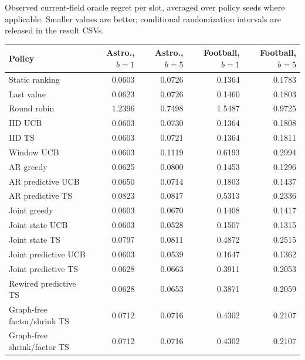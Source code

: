 \noindent Observed current-field oracle regret per slot, averaged over policy seeds where applicable. Smaller values are better; conditional randomization intervals are released in the result CSVs.
\begin{center}\small
\begin{tabular}{lrrrr}
\toprule
Policy & Astro., $b=1$ & Astro., $b=5$ & Football, $b=1$ & Football, $b=5$ \\
\midrule
Static ranking & 0.0603 & 0.0726 & 0.1364 & 0.1783 \\
Last value & 0.0623 & 0.0726 & 0.1460 & 0.1803 \\
Round robin & 1.2396 & 0.7498 & 1.5487 & 0.9725 \\
IID UCB & 0.0603 & 0.0730 & 0.1364 & 0.1808 \\
IID TS & 0.0603 & 0.0721 & 0.1364 & 0.1811 \\
Window UCB & 0.0603 & 0.1119 & 0.6193 & 0.2994 \\
AR greedy & 0.0625 & 0.0800 & 0.1453 & 0.1296 \\
AR predictive UCB & 0.0650 & 0.0714 & 0.1803 & 0.1437 \\
AR predictive TS & 0.0823 & 0.0817 & 0.5313 & 0.2336 \\
Joint greedy & 0.0603 & 0.0670 & 0.1408 & 0.1417 \\
Joint state UCB & 0.0603 & 0.0528 & 0.1507 & 0.1315 \\
Joint state TS & 0.0797 & 0.0811 & 0.4872 & 0.2515 \\
Joint predictive UCB & 0.0603 & 0.0539 & 0.1647 & 0.1362 \\
Joint predictive TS & 0.0628 & 0.0663 & 0.3911 & 0.2053 \\
Rewired predictive TS & 0.0628 & 0.0653 & 0.3871 & 0.2059 \\
Graph-free factor/shrink TS & 0.0712 & 0.0716 & 0.4302 & 0.2107 \\
Graph-free shrink/factor TS & 0.0712 & 0.0716 & 0.4302 & 0.2107 \\
\bottomrule
\end{tabular}\end{center}
